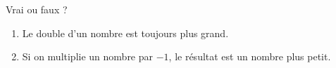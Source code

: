 
\begin{exercice}\label{exosmath-0760}

    Vrai ou faux ?
    \begin{enumerate}
        \item
            Le double d'un nombre est toujours plus grand.
        \item
            Si on multiplie un nombre par $-1$, le résultat est un nombre plus petit.
    \end{enumerate}

\end{exercice}
